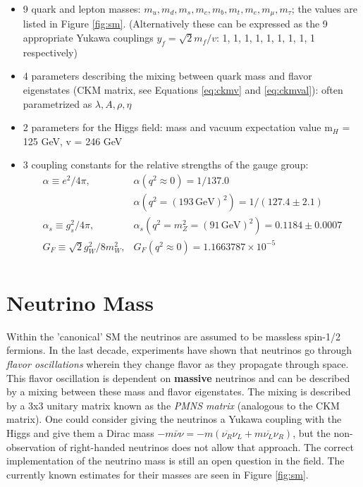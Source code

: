 \begin{itemize}
\item 9 quark and lepton masses: $m_{u}, m_{d}, m_{s}, m_{c}, m_{b}, m_{t}, m_{e}, m_{\mu}, m_{\tau}$; the values are listed in Figure \ref{fig:sm}. (Alternatively these can be expressed as the 9 appropriate Yukawa couplings $y_{f}=\sqrt{2}m_{f} / v$: 1, 1, 1, 1, 1, 1, 1, 1, 1 respectively)
\item 4 parameters describing the mixing between quark mass and flavor eigenstates (CKM matrix, see Equations \ref{eq:ckmv} and \ref{eq:ckmval}): often parametrized as $\lambda, A, \rho, \eta$
\item 2 parameters for the Higgs field: mass and vacuum expectation value m$_{H}$ = 125 GeV, v = 246 GeV 
\item 3 coupling constants for the relative strengths of the gauge group:
\begin{equation*}
\begin{array}{ll}
\alpha \equiv e^{2} / 4 \pi, & \alpha(q^{2} \approx 0) = 1 / 137.0 \\
 & \alpha(q^{2} = (193\,\mathrm{GeV})^{2}) = 1 / (127.4\pm 2.1)\\
\alpha_{s} \equiv g_{s}^{2} / 4 \pi,  & \alpha_{s}(q^{2}=m_{Z}^{2} = (91\,\mathrm{GeV})^{2})= 0.1184 \pm 0.0007\\
G_{F} \equiv \sqrt{2} g^{2}_{W} / 8 m_{W}^{2}, & G_{F} (q^{2}\approx0) = 1.1663787\times10^{-5} \\

\end{array}
\end{equation*}
\end{itemize}

\section{Neutrino Mass}

Within the 'canonical' SM the neutrinos are assumed to be massless spin-1/2 fermions. In the last decade, experiments have shown that neutrinos go through \textit{flavor oscillations} wherein they change flavor as they propagate through space. This flavor oscillation is dependent on \textbf{massive} neutrinos and can be described by a mixing between these mass and flavor eigenstates. The mixing is described by a 3x3 unitary matrix known as the \textit{PMNS matrix} (analogous to the CKM matrix). One could consider giving the neutrinos a Yukawa coupling with the Higgs and give them a Dirac mass $-m\bar{\nu}\nu = -m(\overline{\nu_{R}}\nu_{L} + m\overline{\nu_{L}}\nu_{R})$, but the non-observation of right-handed neutrinos does not allow that approach. The correct implementation of the neutrino mass is still an open question in the field. The currently known estimates for their masses are seen in Figure \ref{fig:sm}.

